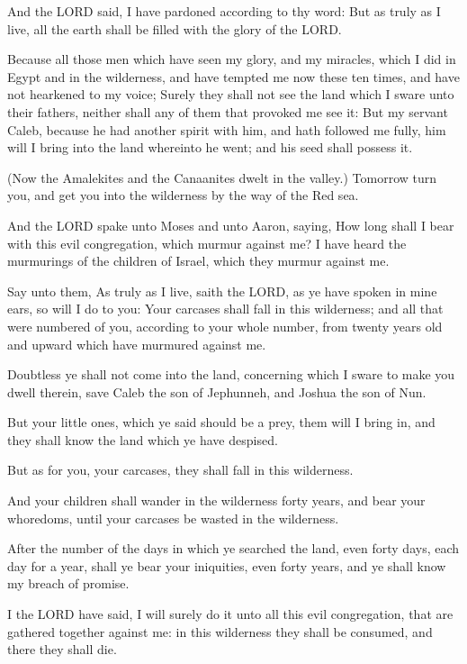 \verse And the LORD said, I have pardoned according to thy word: \verse
But as truly as I live, all the earth shall be filled with the glory
of the LORD.

\verse Because all those men which have seen my glory, and my miracles,
which I did in Egypt and in the wilderness, and have tempted me now
these ten times, and have not hearkened to my voice; \verse Surely they
shall not see the land which I sware unto their fathers, neither shall
any of them that provoked me see it: \verse But my servant Caleb,
because he had another spirit with him, and hath followed me fully,
him will I bring into the land whereinto he went; and his seed shall
possess it.

\verse (Now the Amalekites and the Canaanites dwelt in the valley.)
Tomorrow turn you, and get you into the wilderness by the way of the
Red sea.

\verse And the LORD spake unto Moses and unto Aaron, saying, \verse How
long shall I bear with this evil congregation, which murmur against
me? I have heard the murmurings of the children of Israel, which they
murmur against me.

\verse Say unto them, As truly as I live, saith the LORD, as ye have
spoken in mine ears, so will I do to you: \verse Your carcases shall
fall in this wilderness; and all that were numbered of you, according
to your whole number, from twenty years old and upward which have
murmured against me.

\verse Doubtless ye shall not come into the land, concerning which I
sware to make you dwell therein, save Caleb the son of Jephunneh, and
Joshua the son of Nun.

\verse But your little ones, which ye said should be a prey, them will
I bring in, and they shall know the land which ye have despised.

\verse But as for you, your carcases, they shall fall in this
wilderness.

\verse And your children shall wander in the wilderness forty years,
and bear your whoredoms, until your carcases be wasted in the
wilderness.

\verse After the number of the days in which ye searched the land, even
forty days, each day for a year, shall ye bear your iniquities, even
forty years, and ye shall know my breach of promise.

\verse I the LORD have said, I will surely do it unto all this evil
congregation, that are gathered together against me: in this
wilderness they shall be consumed, and there they shall die.

